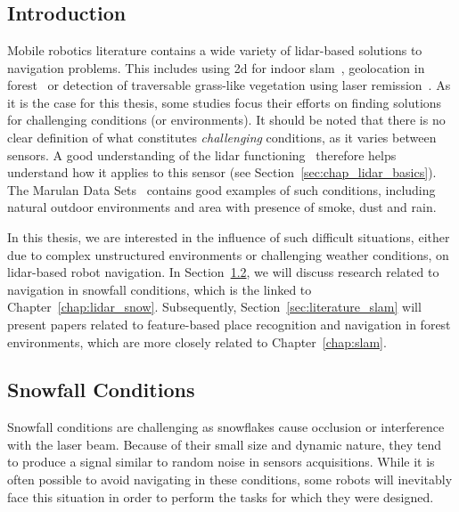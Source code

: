 \chapter{\chapzerotitle}
\label{chap:literature_review}


\section{Introduction}

Mobile robotics literature contains a wide variety of \gls*{lidar}-based solutions to navigation problems. This includes using \gls*{2d} for indoor \gls*{slam}~\citep{Grisetti2007, Kohlbrecher2011}, geolocation in forest~\citep{Hussein2015} or detection of traversable grass-like vegetation using laser remission~\citep{Wurm2009}. As it is the case for this thesis, some studies focus their efforts on finding solutions for challenging conditions (or environments). It should be noted that there is no clear definition of what constitutes \emph{challenging} conditions, as it varies between sensors. A good understanding of the \gls*{lidar} functioning~\citep{Bosch2001} therefore helps understand how it applies to this sensor (see Section~\ref{sec:chap_lidar_basics}). The Marulan Data Sets~\citep{Peynot2010} contains good examples of such conditions, including natural outdoor environments and area with presence of smoke, dust and rain.

In this thesis, we are interested in the influence of such difficult situations, either due to complex unstructured environments or challenging weather conditions, on \gls*{lidar}-based robot navigation. In Section~\ref{sec:literature_snow}, we will discuss research related to navigation in snowfall conditions, which is the linked to Chapter~\ref{chap:lidar_snow}. Subsequently, Section~\ref{sec:literature_slam} will present papers related to feature-based place recognition and navigation in forest environments, which are more closely related to Chapter~\ref{chap:slam}. 


\section{Snowfall Conditions}
\label{sec:literature_snow}

Snowfall conditions are challenging as snowflakes cause occlusion or interference with the laser beam. Because of their small size and dynamic nature, they tend to produce a signal similar to random noise in sensors acquisitions. While it is often possible to avoid navigating in these conditions, some robots will inevitably face this situation in order to perform the tasks for which they were designed. 

